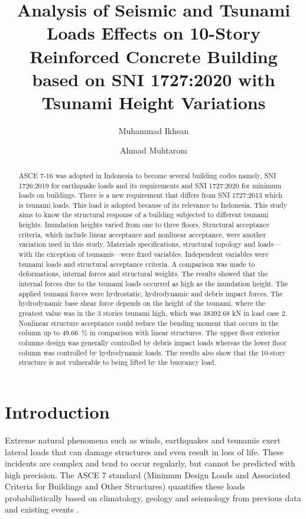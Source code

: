 \documentclass{cup-pan}
\title{Analysis of Seismic and Tsunami Loads Effects on 10-Story Reinforced Concrete Building based on SNI 1727:2020 with Tsunami Height Variations}
\author[1]{Muhammad Ikhsan}
\author[1]{Ahmad Muhtarom}
\affil[1]{Department Civil Engineering and Planning, Sriwijaya University, Jl. Raya Prabumulih – KM 32, Indralaya, Ogan Ilir, South Sumatera. Email: \url{sipil@ft.unsri.ac.id}}
\begin{document}
\maketitle





\begin{abstract}
ASCE 7-16 was adopted in Indonesia to become several building codes namely, SNI 1726:2019 for earthquake loads and its requirements and SNI 1727:2020 for minimum loads on buildings. There is a new requirement that differs from SNI 1727:2013 which is tsunami loads. This load is adopted because of its relevance to Indonesia. This study aims to know the structural response of a building subjected to different tsunami heights. Inundation heights varied from one to three floors. Structural acceptance criteria, which include linear acceptance and nonlinear acceptance, were another variation used in this study. Materials specifications, structural topology and loads—with the exception of tsunamis—were fixed variables. Independent variables were tsunami loads and structural acceptance criteria. A comparison was made to deformations, internal forces and structural weights. The results showed that the internal forces due to the tsunami loads occurred as high as the inundation height. The applied tsunami forces were hydrostatic, hydrodynamic and debris impact forces. The hydrodynamic base shear force depends on the height of the tsunami, where the greatest value was in the 3 stories tsunami high, which was \num{38392.68} kN in load case 2. Nonlinear structure acceptance could reduce the bending moment that occurs in the column up to \SI{49.66}{\percent} in comparison with linear structures. The upper floor exterior columns design was generally controlled by debris impact loads whereas the lower floor column was controlled by hydrodynamic loads. The results also show that the 10-story structure is not vulnerable to being lifted by the buoyancy load.



\end{abstract}

\section{Introduction}
\label{sec:overview}

Extreme natural phenomena such as winds, earthquakes and tsunamis exert lateral loads that can damage structures and even result in loss of life. These incidents are complex and tend to occur regularly, but cannot be predicted with high precision. The ASCE 7 standard (Minimum Design Loads and Associated Criteria for Buildings and Other Structures) quantifies these loads probabilistically based on climatology, geology and seismology from previous data and existing events \citep{leet}.
\end{document}
